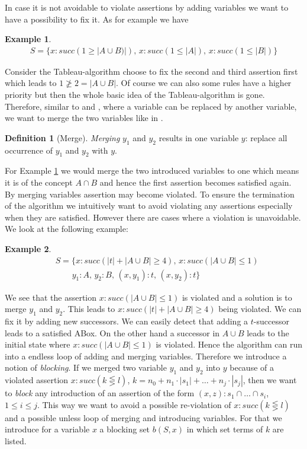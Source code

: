 \documentclass[a4paper,11pt]{scrartcl}
\theoremstyle{break}
\theoremstyle{definition}
\newtheorem{mydef}{Definition}
\newtheorem{ex}{Example}
\begin{document}
In case it is not avoidable to violate assertions by adding variables we want to have a possibility to fix it. As for example we have
\begin{ex}\label{mergeex1}
\begin{align*}
S=\{x:succ(1\geq |A\cup B)|),\,x:succ(1\leq |A|),\,x:succ(1\leq |B|)\}
\end{align*}
\end{ex}
Consider the Tableau-algorithm choose to fix the second and third assertion first which leads to $1\not\geq 2=|A\cup B|$. Of course we can also some rules have a higher priority but then the whole basic idea of the Tableau-algorithm is gone. Therefore, similar to \cite{1} and \cite{6}, where a variable can be replaced by another variable, we want to merge the two variables like in \cite{2}.
\begin{mydef}[Merge]
\textit{Merging} $y_1$ and $y_2$ results in one variable $y$: replace all occurrence of $y_1$ and $y_2$ with $y$. 
\end{mydef}
For Example \ref{mergeex1} we would merge the two introduced variables to one which means it is of the concept $A\cap B$ and hence the first assertion becomes satisfied again.\\
By merging variables assertion may become violated. To ensure the termination of the algorithm we intuitively want to avoid violating any assertions especially when they are satisfied. However there are cases where a violation is unavoidable. We look at the following example:
\begin{ex}
\begin{align*}
&S=\{x:succ(|t|+|A\cup B|\geq 4),\,x:succ(|A\cup B|\leq 1)\\
&\quad\quad y_1:A,\,y_2:B,\,(x,y_1):t,\,(x,y_2):t\}
\end{align*}
\end{ex}
We see that the assertion $x:succ(|A\cup B|\leq 1)$ is violated and a solution is to merge $y_1$ and $y_2$. This leads to $x:succ(|t|+|A\cup B|\geq 4)$ being violated. We can fix it by adding new successors. We can easily detect that adding a $t$-successor leads to a satisfied ABox. On the other hand a successor in $A\cup B$ leads to the initial state where $x:succ(|A\cup B|\leq 1)$ is violated. Hence the algorithm can run into a endless loop of adding and merging variables. Therefore we introduce a notion of \textit{blocking}. If we merged two variable $y_1$ and $y_2$ into $y$ because of a violated assertion $x:succ(k\lesseqgtr l)$, $k=n_0+n_1\cdot |s_1|+\dots + n_j\cdot|s_j|$, then we want to \textit{block} any introduction of an assertion of the form $(x,z):s_1\cap\dots \cap s_i$, $1\leq i\leq j$. This way we want to avoid a possible re-violation of $x:succ(k\lesseqgtr l)$ and a possible unless loop of merging and introducing variables. For that we introduce for a variable $x$ a blocking set $b(S,x)$ in which set terms of $k$ are listed.
\end{document}
